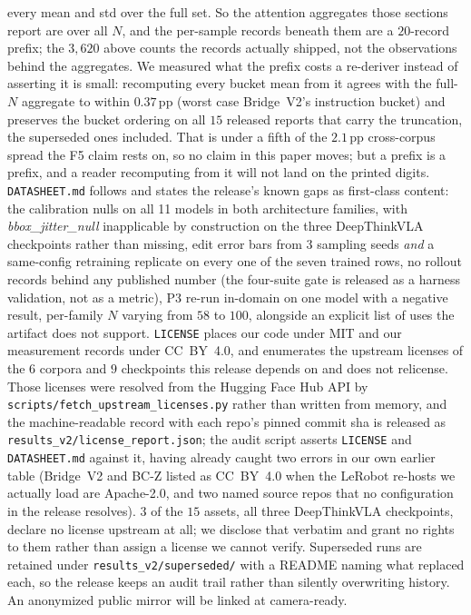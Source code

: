 \documentclass{article}
\begin{document}
every mean and std over the full set. So the attention aggregates those sections report are over all $N$, and the per-sample records beneath them are a $20$-record prefix; the $3{,}620$ above counts the records actually shipped, not the observations behind the aggregates. We measured what the prefix costs a re-deriver instead of asserting it is small: recomputing every bucket mean from it agrees with the full-$N$ aggregate to within $\mathbf{0.37}$\,pp (worst case Bridge~V2's instruction bucket) and preserves the bucket ordering on all $15$ released reports that carry the truncation, the superseded ones included. That is under a fifth of the $2.1$\,pp cross-corpus spread the F5 claim rests on, so no claim in this paper moves; but a prefix is a prefix, and a reader recomputing from it will not land on the printed digits. \texttt{DATASHEET.md} follows \citet{datasheets} and states the release's known gaps as first-class content: the calibration nulls on all 11 models in both architecture families, with \emph{bbox\_jitter\_null} inapplicable by construction on the three DeepThinkVLA checkpoints rather than missing, edit error bars from 3 sampling seeds \emph{and} a same-config retraining replicate on every one of the seven trained rows, no rollout records behind any published number (the four-suite gate is released as a harness validation, not as a metric), P3 re-run in-domain on one model with a negative result, per-family $N$ varying from $58$ to $100$, alongside an explicit list of uses the artifact does not support. \texttt{LICENSE} places our code under MIT and our measurement records under CC~BY~4.0, and enumerates the upstream licenses of the $6$ corpora and $9$ checkpoints this release depends on and does not relicense. Those licenses were resolved from the Hugging Face Hub API by \texttt{scripts/fetch\_upstream\_licenses.py} rather than written from memory, and the machine-readable record with each repo's pinned commit sha is released as \texttt{results\_v2/license\_report.json}; the audit script asserts \texttt{LICENSE} and \texttt{DATASHEET.md} against it, having already caught two errors in our own earlier table (Bridge~V2 and BC-Z listed as CC~BY~4.0 when the LeRobot re-hosts we actually load are Apache-2.0, and two named source repos that no configuration in the release resolves). $3$ of the $15$ assets, all three DeepThinkVLA checkpoints, declare no license upstream at all; we disclose that verbatim and grant no rights to them rather than assign a license we cannot verify. Superseded runs are retained under \texttt{results\_v2/superseded/} with a README naming what replaced each, so the release keeps an audit trail rather than silently overwriting history. An anonymized public mirror will be linked at camera-ready.
\end{document}
